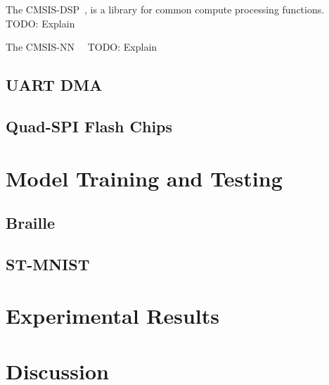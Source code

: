 \documentclass[11pt,a4paper]{article}
\begin{document}
The CMSIS-DSP~\cite{cmsis_dsp}, is a library for common compute processing functions. 
TODO: Explain

The CMSIS-NN~\cite{lai2018cmsisnnefficientneuralnetwork}~\cite{cmsis_nn}
TODO: Explain

\subsection{UART DMA}

\subsection{Quad-SPI Flash Chips}

\subsection{}


\section{Model Training and Testing}

\subsection{Braille}

\subsection{ST-MNIST}



\section{Experimental Results}

\section{Discussion}
\end{document}
